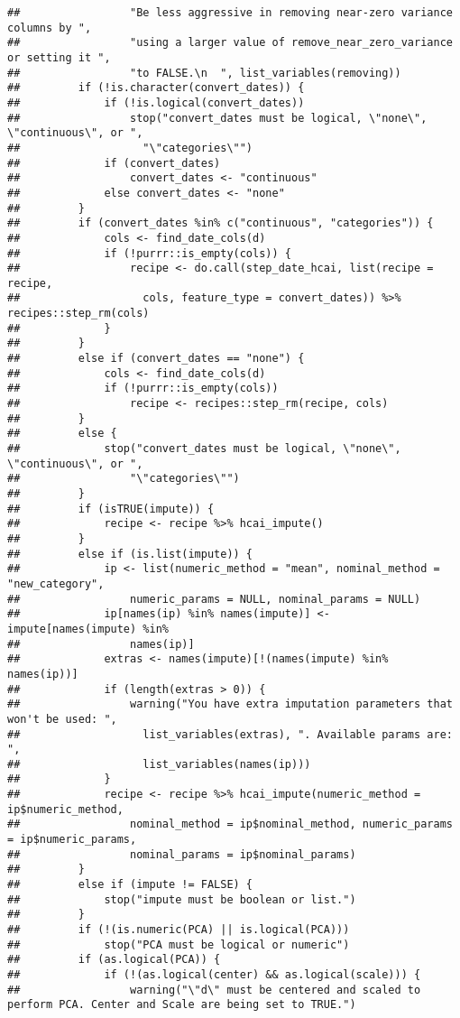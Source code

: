 \documentclass[
]{article}
\begin{document}
\begin{verbatim}
##                 "Be less aggressive in removing near-zero variance columns by ", 
##                 "using a larger value of remove_near_zero_variance or setting it ", 
##                 "to FALSE.\n  ", list_variables(removing))
##         if (!is.character(convert_dates)) {
##             if (!is.logical(convert_dates)) 
##                 stop("convert_dates must be logical, \"none\", \"continuous\", or ", 
##                   "\"categories\"")
##             if (convert_dates) 
##                 convert_dates <- "continuous"
##             else convert_dates <- "none"
##         }
##         if (convert_dates %in% c("continuous", "categories")) {
##             cols <- find_date_cols(d)
##             if (!purrr::is_empty(cols)) {
##                 recipe <- do.call(step_date_hcai, list(recipe = recipe, 
##                   cols, feature_type = convert_dates)) %>% recipes::step_rm(cols)
##             }
##         }
##         else if (convert_dates == "none") {
##             cols <- find_date_cols(d)
##             if (!purrr::is_empty(cols)) 
##                 recipe <- recipes::step_rm(recipe, cols)
##         }
##         else {
##             stop("convert_dates must be logical, \"none\", \"continuous\", or ", 
##                 "\"categories\"")
##         }
##         if (isTRUE(impute)) {
##             recipe <- recipe %>% hcai_impute()
##         }
##         else if (is.list(impute)) {
##             ip <- list(numeric_method = "mean", nominal_method = "new_category", 
##                 numeric_params = NULL, nominal_params = NULL)
##             ip[names(ip) %in% names(impute)] <- impute[names(impute) %in% 
##                 names(ip)]
##             extras <- names(impute)[!(names(impute) %in% names(ip))]
##             if (length(extras > 0)) {
##                 warning("You have extra imputation parameters that won't be used: ", 
##                   list_variables(extras), ". Available params are: ", 
##                   list_variables(names(ip)))
##             }
##             recipe <- recipe %>% hcai_impute(numeric_method = ip$numeric_method, 
##                 nominal_method = ip$nominal_method, numeric_params = ip$numeric_params, 
##                 nominal_params = ip$nominal_params)
##         }
##         else if (impute != FALSE) {
##             stop("impute must be boolean or list.")
##         }
##         if (!(is.numeric(PCA) || is.logical(PCA))) 
##             stop("PCA must be logical or numeric")
##         if (as.logical(PCA)) {
##             if (!(as.logical(center) && as.logical(scale))) {
##                 warning("\"d\" must be centered and scaled to perform PCA. Center and Scale are being set to TRUE.")

\end{verbatim}
\end{document}
